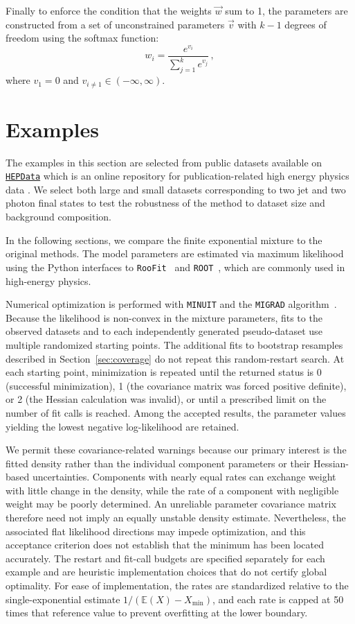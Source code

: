 \documentclass[a4paper,11pt]{article}
\begin{document}
Finally to enforce the condition that the weights $\vec{w}$ sum to 1, the parameters are 
constructed from a set of unconstrained parameters $\vec{v}$ with $k-1$ degrees of freedom 
using the softmax function:
\begin{equation}
\label{softmax}
w_i = \frac{e^{v_i}}{\sum_{j=1}^{k}e^{v_j}} \, ,
\end{equation}
where $v_1=0$ and $v_{i\neq 1} \in (-\infty,\infty)$.

\section{Examples} \label{sec:examples}

The examples in this section are selected from public datasets available on \href{https://www.hepdata.net/}{\texttt{HEPData}} which is an online repository for publication-related high energy physics data \cite{Maguire_2017}. We select both large and small datasets corresponding to two jet and two photon final states to test the robustness of the method to dataset size and background composition.

In the following sections, we compare the finite exponential mixture to the original methods. The model parameters are estimated via maximum likelihood using the Python interfaces to \texttt{RooFit}~\cite{RooFit} and \texttt{ROOT}~\cite{ROOT}, which are commonly used in high-energy physics.

Numerical optimization is performed with \texttt{MINUIT} and the \texttt{MIGRAD} algorithm~\cite{Minuit2}. Because the likelihood is non-convex in the mixture parameters, fits to the observed datasets and to each independently generated pseudo-dataset use multiple randomized starting points. The additional fits to bootstrap resamples described in Section~\ref{sec:coverage} do not repeat this random-restart search. At each starting point, minimization is repeated until the returned status is 0 (successful minimization), 1 (the covariance matrix was forced positive definite), or 2 (the Hessian calculation was invalid), or until a prescribed limit on the number of fit calls is reached. Among the accepted results, the parameter values yielding the lowest negative log-likelihood are retained.

We permit these covariance-related warnings because our primary interest is the fitted density rather than the individual component parameters or their Hessian-based uncertainties. Components with nearly equal rates can exchange weight with little change in the density, while the rate of a component with negligible weight may be poorly determined. An unreliable parameter covariance matrix therefore need not imply an equally unstable density estimate. Nevertheless, the associated flat likelihood directions may impede optimization, and this acceptance criterion does not establish that the minimum has been located accurately. The restart and fit-call budgets are specified separately for each example and are heuristic implementation choices that do not certify global optimality. For ease of implementation, the rates are standardized relative to the single-exponential estimate $1/(\mathbb{E}(X)-X_{\min})$, and each rate is capped at 50 times that reference value to prevent overfitting at the lower 
boundary.
\end{document}
